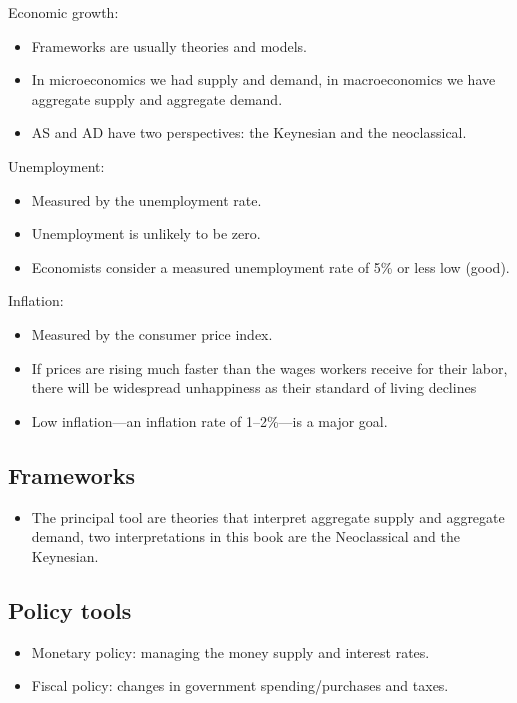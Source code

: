 \documentclass{article}
\begin{document}
Economic growth: 
\begin{itemize}
    \item Frameworks are usually theories and models. 
    \item In microeconomics we had supply and demand, in macroeconomics we have aggregate supply and aggregate demand.
    \item AS and AD have two perspectives: the Keynesian and the neoclassical.  
\end{itemize}
Unemployment: 
\begin{itemize}
    \item Measured by the unemployment rate. 
    \item Unemployment is unlikely to be zero.
    \item Economists consider a measured unemployment rate of 5\% or less low (good).
\end{itemize}
Inflation: 
\begin{itemize}
    \item Measured by the consumer price index.
    \item If prices are rising much faster than the wages workers receive for their labor, there will be widespread unhappiness as their standard of living declines
    \item Low inflation—an inflation rate of 1–2\%—is a major goal. 
\end{itemize}

\subsection{Frameworks}
\begin{itemize}
    \item The principal tool are theories that interpret aggregate supply and aggregate demand, two interpretations in this book are the Neoclassical and the Keynesian.
\end{itemize}

\subsection{Policy tools}
\begin{itemize}
    \item Monetary policy: managing the money supply and interest rates.
    \item Fiscal policy: changes in government spending/purchases and taxes.
\end{itemize}
\end{document}
